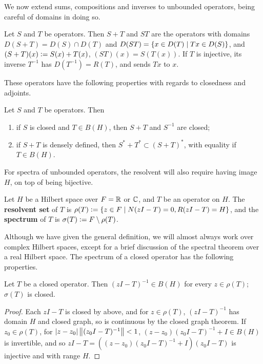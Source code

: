 \documentclass[10pt]{amsart}
\begin{document}
We now extend sums, compositions and inverses to unbounded operators, being careful of domains in doing so.
\begin{definition}
    Let $S$ and $T$ be operators. Then $S + T$ and $ST$ are the operators with domains $D(S + T) = D(S) \cap D(T)$ and $D(ST) = \left\{  x \in D(T) \mid Tx \in D(S)  \right\}$, and $(S + T)(x) \vcentcolon= S(x) + T(x)$, $(ST)(x) = S(T(x))$. If $T$ is injective, its inverse $T^{-1}$ has $D(T^{-1}) = R(T)$, and sends $Tx$ to $x$.
\end{definition}
These operators have the following properties with regards to closedness and adjoints. %
\begin{lemma}
    Let $S$ and $T$ be operators. Then
    \begin{enumerate}
        \item if $S$ is closed and $T \in B(H)$, then $S + T$ and $S^{-1}$ are closed;
        \item if $S + T$ is densely defined, then $S^* + T^* \subset (S + T)^*$, with equality if $T \in B(H)$.
    \end{enumerate}
\end{lemma}
For spectra of unbounded operators, the resolvent will also require having image $H$, on top of being bijective.
\begin{definition}
    Let $H$ be a Hilbert space over $F = \mathbb{R}$ or $\mathbb{C}$, and $T$ be an operator on $H$. The \textbf{resolvent set} of $T$ is $\rho(T) \vcentcolon= \left\{  z \in F \mid N(zI - T) = 0, R(zI - T) = H  \right\}$, and the \textbf{spectrum} of $T$ is $\sigma(T) \vcentcolon= F \setminus \rho(T)$.
\end{definition}
Although we have given the general definition, we will almost always work over complex Hilbert spaces, except for a brief discussion of the spectral theorem over a real Hilbert space. The spectrum of a closed operator has the following properties.
\begin{proposition}\label{closedprops}
    Let $T$ be a closed operator. Then $(zI - T)^{-1} \in B(H)$ for every $z \in \rho(T)$; $\sigma(T)$ is closed.
\end{proposition}
\begin{proof}
    Each $zI - T$ is closed by above, and for $z \in \rho(T)$, $(zI - T)^{-1}$ has domain $H$ and closed graph, so is continuous by the closed graph theorem. If $z_0 \in \rho(T)$, for $\left| z - z_0 \right|\left\| (z_0I - T)^{-1} \right\| < 1$, $(z - z_0)(z_0I - T)^{-1} + I \in B(H)$ is invertible, and so $zI - T = ((z - z_0)(z_0I - T)^{-1} + I)(z_0I - T)$ is injective and with range $H$.
\end{proof}
\end{document}
